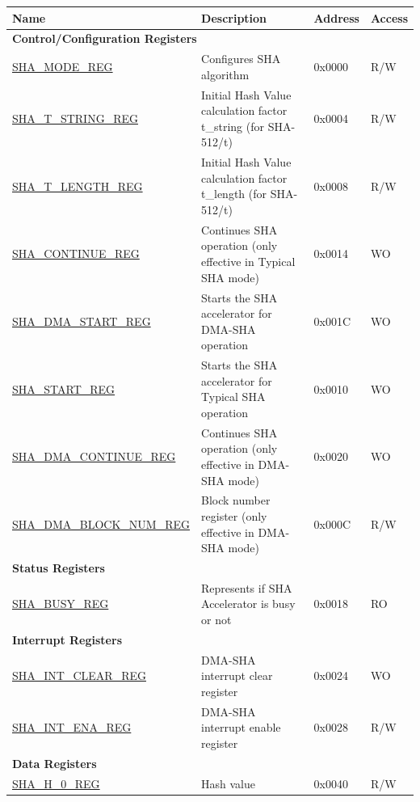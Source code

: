 \begin{longtable}{ | l | l | l |l | }
\hline\rowcolor{lightgray}
\textbf{Name} & \textbf{Description} &  \textbf{Address} & \textbf{Access} \\ \hline
\endhead
\multicolumn{4}{|l|}{\textbf{Control/Configuration Registers}} \\ \hline
\hyperref[regdesc:SHAMODEREG]{SHA\_MODE\_REG} & Configures SHA algorithm & 0x0000 & R/W \\ \hline
\hyperref[regdesc:SHATSTRINGREG]{SHA\_T\_STRING\_REG} & Initial Hash Value calculation factor t\_string (for SHA-512/t) & 0x0004 & R/W \\ \hline
\hyperref[regdesc:SHATLENGTHREG]{SHA\_T\_LENGTH\_REG} & Initial Hash Value calculation factor t\_length (for SHA-512/t) & 0x0008 & R/W \\ \hline
\hyperref[regdesc:SHACONTINUEREG]{SHA\_CONTINUE\_REG} & Continues SHA operation (only effective in Typical SHA mode) & 0x0014 & WO \\ \hline
\hyperref[regdesc:SHADMASTARTREG]{SHA\_DMA\_START\_REG} & Starts the SHA accelerator for DMA-SHA operation & 0x001C & WO \\ \hline
\hyperref[regdesc:SHASTARTREG]{SHA\_START\_REG} & Starts the SHA accelerator for Typical SHA operation & 0x0010 & WO \\ \hline
\hyperref[regdesc:SHADMACONTINUEREG]{SHA\_DMA\_CONTINUE\_REG} & Continues SHA operation (only effective in DMA-SHA mode) & 0x0020 & WO \\ \hline
\hyperref[regdesc:SHADMABLOCKNUMREG]{SHA\_DMA\_BLOCK\_NUM\_REG} & Block number register (only effective in DMA-SHA mode) & 0x000C & R/W \\ \hline
\multicolumn{4}{|l|}{\textbf{Status Registers}} \\ \hline
\hyperref[regdesc:SHABUSYREG]{SHA\_BUSY\_REG} & Represents if SHA Accelerator is busy or not & 0x0018 & RO \\ \hline
\multicolumn{4}{|l|}{\textbf{Interrupt Registers}} \\ \hline
\hyperref[regdesc:SHAINTCLEARREG]{SHA\_INT\_CLEAR\_REG} & DMA-SHA interrupt clear register & 0x0024 & WO \\ \hline
\hyperref[regdesc:SHAINTENAREG]{SHA\_INT\_ENA\_REG} & DMA-SHA interrupt enable register & 0x0028 & R/W \\ \hline
\multicolumn{4}{|l|}{\textbf{Data Registers}} \\ \hline
\hyperref[regdesc:SHAHNREG]{SHA\_H\_0\_REG} & Hash value & 0x0040 & R/W \\ \hline

\end{longtable}
